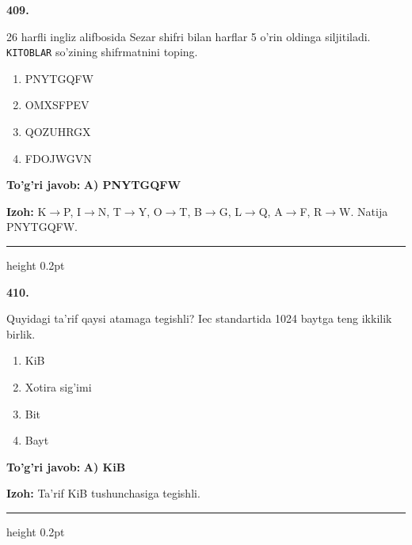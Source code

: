 \documentclass[10pt,a4paper,oneside]{article}
\begin{document}
\noindent\textbf{\color{ink}409.}
\par
26 harfli ingliz alifbosida Sezar shifri bilan harflar 5 o'rin oldinga siljitiladi. \texttt{KITOBLAR} so'zining shifrmatnini toping.
\begin{enumerate}[label=\Alph*),leftmargin=9mm]
\item PNYTGQFW
\item OMXSFPEV
\item QOZUHRGX
\item FDOJWGVN
\end{enumerate}
\begin{tcolorbox}[enhanced,breakable,colback=teal!4,colframe=teal!50!black,boxrule=0.5pt,arc=1.1mm,left=3mm,right=3mm,top=1.7mm,bottom=1.7mm,before skip=2mm,after skip=2mm]
\textbf{\color{teal}To'g'ri javob:} \textbf{A) PNYTGQFW}
\par\smallskip
\textbf{Izoh:} K\ensuremath{\to}P, I\ensuremath{\to}N, T\ensuremath{\to}Y, O\ensuremath{\to}T, B\ensuremath{\to}G, L\ensuremath{\to}Q, A\ensuremath{\to}F, R\ensuremath{\to}W. Natija PNYTGQFW.
\end{tcolorbox}
\vspace{2mm}\hrule height 0.2pt \vspace{3mm}

\noindent\textbf{\color{ink}410.}
\par
Quyidagi ta'rif qaysi atamaga tegishli? Iec standartida 1024 baytga teng ikkilik birlik.
\begin{enumerate}[label=\Alph*),leftmargin=9mm]
\item KiB
\item Xotira sig'imi
\item Bit
\item Bayt
\end{enumerate}
\begin{tcolorbox}[enhanced,breakable,colback=teal!4,colframe=teal!50!black,boxrule=0.5pt,arc=1.1mm,left=3mm,right=3mm,top=1.7mm,bottom=1.7mm,before skip=2mm,after skip=2mm]
\textbf{\color{teal}To'g'ri javob:} \textbf{A) KiB}
\par\smallskip
\textbf{Izoh:} Ta'rif KiB tushunchasiga tegishli.
\end{tcolorbox}
\vspace{2mm}\hrule height 0.2pt \vspace{3mm}
\end{document}
